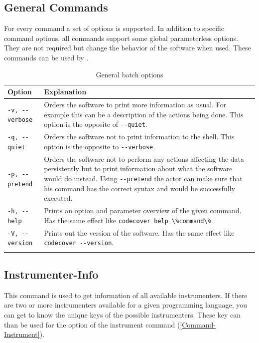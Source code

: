 \subsection{General Commands}\label{General}
For every command a set of options is supported. In addition to specific command options, all commands support some global parameterless options. They are not required but change the behavior of the software when used. These commands can be used by .
\begin{longtable}{|l|p{8cm}|}\hline
   {\textbf{Option}} &
   {\textbf{Explanation}} \\\hline \hline \endhead
     \verb$-v, --verbose$ & Orders the software to print more information as usual. For example this can be a description of the actions being done. This option is the opposite of \verb$--quiet$. \\\hline
     \verb$-q, --quiet$ & Orders the software not to print information to the shell. This option is the opposite to \verb$--verbose$. \\\hline
     \verb$-p, --pretend$ & Orders the software not to perform any actions affecting the data persistently but to print information about what the software would do instead. Using \verb$--pretend$ the actor can make sure that his command has the correct syntax and would be successfully executed. \\\hline
     \verb$-h, --help$ & Prints an option and parameter overview of the given command. Has the same effect like \verb$codecover help \%command\%$. \\\hline
     \verb$-V, --version$ & Prints out the version of the software. Has the same effect like \verb$codecover --version$. \\\hline
  \caption{General batch options}
  \label{fr_tb:General batch command options}
\end{longtable}

\subsection{Instrumenter-Info}\label{Command-Instrumenter-Info}
This command is used to get information of all available instrumenters. If there are two or more instrumenters available for a given programming language, you can get to know the unique keys of the possible instrumenters. These key can than be used for the option  of the instrument command (\ref{Command-Instrument}).

